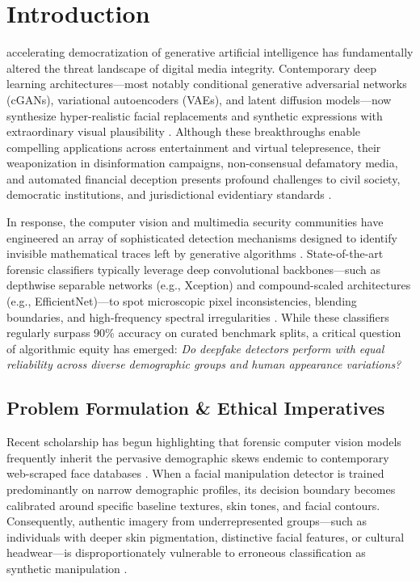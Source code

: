 \documentclass[journal]{IEEEtran}
\begin{document}
\section{Introduction}
 accelerating democratization of generative artificial intelligence has fundamentally altered the threat landscape of digital media integrity. Contemporary deep learning architectures---most notably conditional generative adversarial networks (cGANs), variational autoencoders (VAEs), and latent diffusion models---now synthesize hyper-realistic facial replacements and synthetic expressions with extraordinary visual plausibility \cite{tolosana2020deepfakes, goodfellow2014generative}. Although these breakthroughs enable compelling applications across entertainment and virtual telepresence, their weaponization in disinformation campaigns, non-consensual defamatory media, and automated financial deception presents profound challenges to civil society, democratic institutions, and jurisdictional evidentiary standards \cite{zhang2022deepfake, raji2020saving}.

In response, the computer vision and multimedia security communities have engineered an array of sophisticated detection mechanisms designed to identify invisible mathematical traces left by generative algorithms \cite{li2020facexray, chai2020makes}. State-of-the-art forensic classifiers typically leverage deep convolutional backbones---such as depthwise separable networks (e.g., Xception) and compound-scaled architectures (e.g., EfficientNet)---to spot microscopic pixel inconsistencies, blending boundaries, and high-frequency spectral irregularities \cite{chollet2017xception, tan2019efficientnet, qian2020thinking}. While these classifiers regularly surpass 90\% accuracy on curated benchmark splits, a critical question of algorithmic equity has emerged: \textit{Do deepfake detectors perform with equal reliability across diverse demographic groups and human appearance variations?}

\subsection{Problem Formulation \& Ethical Imperatives}
Recent scholarship has begun highlighting that forensic computer vision models frequently inherit the pervasive demographic skews endemic to contemporary web-scraped face databases \cite{hazirbas2022towards, trinh2021examination}. When a facial manipulation detector is trained predominantly on narrow demographic profiles, its decision boundary becomes calibrated around specific baseline textures, skin tones, and facial contours. Consequently, authentic imagery from underrepresented groups---such as individuals with deeper skin pigmentation, distinctive facial features, or cultural headwear---is disproportionately vulnerable to erroneous classification as synthetic manipulation \cite{pu2022fairness, waelen2023struggle}.
\end{document}
